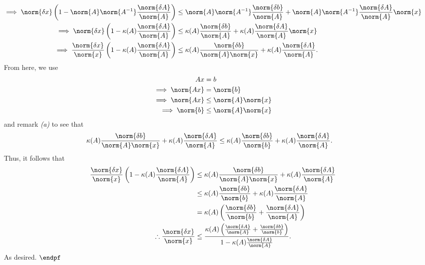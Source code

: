 \documentclass{report}
\begin{document}
\begin{align*}
            \implies \norm{\delta x}\left(1-\norm{A}\norm{A^{-1}}\frac{\norm{\delta A}}{\norm{A}}\right) &\leq \norm{A}\norm{A^{-1}}\frac{\norm{\delta b}}{\norm{A}} + \norm{A}\norm{A^{-1}}\frac{\norm{\delta A}}{\norm{A}}\norm{x} \\
            \implies \norm{\delta x}\left(1-\kappa(A)\frac{\norm{\delta A}}{\norm{A}}\right) &\leq \kappa(A)\frac{\norm{\delta b}}{\norm{A}} + \kappa(A)\frac{\norm{\delta A}}{\norm{A}}\norm{x} \\ 
            \implies \frac{\norm{\delta x}}{\norm{x}}\left(1-\kappa(A)\frac{\norm{\delta A}}{\norm{A}}\right) &\leq \kappa(A)\frac{\norm{\delta b}}{\norm{A}\norm{x}} + \kappa(A)\frac{\norm{\delta A}}{\norm{A}}
        .\end{align*} 
        From here, we use 
        \begin{align*}
            Ax &= b \\
            \implies \norm{Ax} &= \norm{b} \\
            \implies \norm{Ax} &\leq \norm{A}\norm{x} \\
            \implies \norm{b} &\leq \norm{A}\norm{x}
        \end{align*}
        and remark \textit{(a)} to see that
        \begin{align*}
            \kappa(A) \frac{\norm{\delta b}}{\norm{A}\norm{x}} + \kappa(A) \frac{\norm{\delta A}}{\norm{A}} & \leq \kappa(A) \frac{\norm{\delta b}}{\norm{b}} + \kappa(A) \frac{\norm{\delta A}}{\norm{A}} 
        .\end{align*}
        Thus, it follows that
        \begin{align*}
            \frac{\norm{\delta x}}{\norm{x}}\left(1-\kappa(A)\frac{\norm{\delta A}}{\norm{A}}\right) &\leq \kappa(A)\frac{\norm{\delta b}}{\norm{A}\norm{x}} + \kappa(A)\frac{\norm{\delta A}}{\norm{A}} \\
                                                                                                              &\leq \kappa(A) \frac{\norm{\delta b}}{\norm{b}} + \kappa(A) \frac{\norm{\delta A}}{\norm{A}}  \\
                                                                                                              &= \kappa(A)\left(\frac{\norm{\delta b}}{\norm{b}}  + \frac{\norm{\delta A}}{\norm{A}}\right) \\
            \therefore \frac{\norm{\delta x}}{\norm{x}} &\leq \frac{\kappa(A)\left(\frac{\norm{\delta A}}{\norm{A}} + \frac{\norm{\delta b}}{\norm{b}}\right)}{1-\kappa(A)\frac{\norm{\delta A}}{\norm{A}}}
        .\end{align*}
        As desired. $\endpf$
\end{document}
